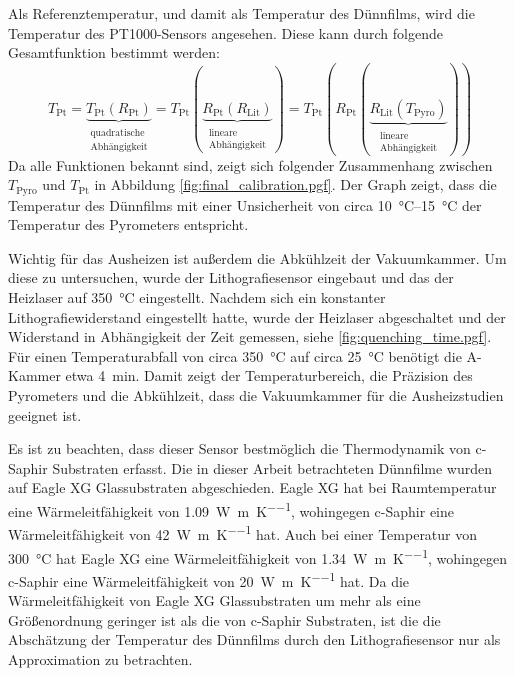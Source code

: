 Als Referenztemperatur, und damit als Temperatur des Dünnfilms, wird die Temperatur des PT1000-Sensors angesehen.
Diese kann durch folgende Gesamtfunktion bestimmt werden:
\begin{equation}
    T_{\mathrm{Pt}}=\underbrace{ T_{\mathrm{Pt}}(R_{\mathrm{Pt}}) }_{
        \substack{\text{quadratische} \\ \text{Abhängigkeit}}}
    =T_{\mathrm{Pt}}(\underbrace{ R_{\mathrm{Pt}}(R_{\mathrm{Lit}}) }_{
        \substack{\text{lineare} \\ \text{Abhängigkeit}}  })
    =T_{\mathrm{Pt}}(R_{\mathrm{Pt}}(\underbrace{ R_{\mathrm{Lit}}(T_{\mathrm{Pyro}}) }_{
        \substack{\text{lineare} \\ \text{Abhängigkeit}}  }))
    \label{eq:temperature_calibration}
\end{equation}
Da alle Funktionen bekannt sind, zeigt sich folgender Zusammenhang zwischen $T_{\mathrm{Pyro}}$ und $T_{\mathrm{Pt}}$
in Abbildung \cref{fig:final_calibration.pgf}.
Der Graph zeigt, dass die Temperatur des Dünnfilms mit einer Unsicherheit von circa \qtyrange{10}{15}{\degreeCelsius}
der Temperatur des Pyrometers entspricht.

Wichtig für das Ausheizen ist außerdem die Abkühlzeit der Vakuumkammer.
Um diese zu untersuchen, wurde der Lithografiesensor eingebaut und das der Heizlaser auf \qty{350}{\degreeCelsius}
eingestellt.
Nachdem sich ein konstanter Lithografiewiderstand eingestellt hatte, wurde der Heizlaser abgeschaltet und der
Widerstand in Abhängigkeit der Zeit gemessen, siehe \cref{fig:quenching_time.pgf}.
Für einen Temperaturabfall von circa \qty{350}{\degreeCelsius} auf circa \qty{25}{\degreeCelsius}
benötigt die A-Kammer etwa \qty{4}{\minute}.
Damit zeigt der Temperaturbereich, die Präzision des Pyrometers und die Abkühlzeit, dass
die Vakuumkammer für die Ausheizstudien geeignet ist.

Es ist zu beachten, dass dieser Sensor bestmöglich die Thermodynamik von c-Saphir Substraten erfasst.
Die in dieser Arbeit betrachteten Dünnfilme wurden auf Eagle XG Glassubstraten abgeschieden.
Eagle XG hat bei Raumtemperatur eine Wärmeleitfähigkeit von \qty{1.09}{\watt\per\meter\per\kelvin}, wohingegen
c-Saphir eine Wärmeleitfähigkeit von \qty{42}{\watt\per\meter\per\kelvin} hat.
Auch bei einer Temperatur von \qty{300}{\degreeCelsius} hat Eagle XG eine Wärmeleitfähigkeit von
\qty{1.34}{\watt\per\meter\per\kelvin}, wohingegen c-Saphir eine Wärmeleitfähigkeit von
\qty{20}{\watt\per\meter\per\kelvin} hat.
Da die Wärmeleitfähigkeit von Eagle XG Glassubstraten um mehr als eine Größenordnung geringer ist als die von
c-Saphir Substraten, ist die die Abschätzung der Temperatur des Dünnfilms durch den Lithografiesensor nur als
Approximation zu betrachten.

